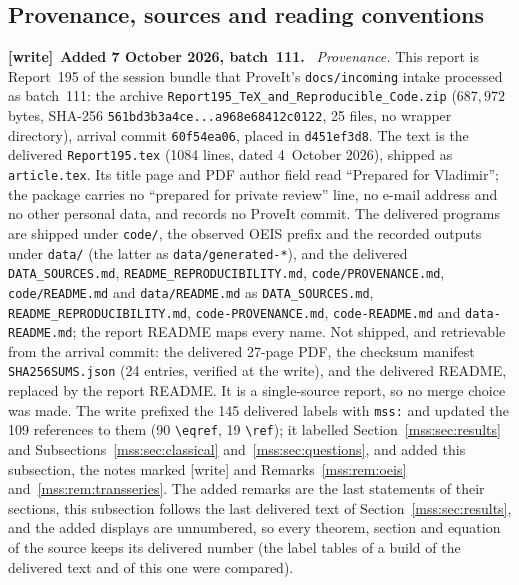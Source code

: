 \documentclass[11pt,letterpaper]{article}
\numberwithin{equation}{section}
\theoremstyle{definition}\newtheorem{definition}[theorem]{Definition}
\theoremstyle{remark}\newtheorem{remark}[theorem]{Remark}
\newcommand{\file}[1]{\nolinkurl{#1}}
\newenvironment{writenote}[1][]{\par\smallskip\begingroup\small
 \noindent\textbf{[write]}\if\relax\detokenize{#1}\relax\else~\textbf{#1.}\fi\ }%
 {\par\endgroup\smallskip}
\begin{document}
\subsection{Provenance, sources and reading conventions}\label{mss:sec:provenance}
\begin{writenote}[Added 7 October 2026, batch~111]
\emph{Provenance.} This report is Report~195 of the session bundle that
ProveIt's \file{docs/incoming} intake processed as batch~111: the archive
\file{Report195_TeX_and_Reproducible_Code.zip} ($687{,}972$ bytes, SHA-256
\file{561bd3b3a4ce...a968e68412c0122}, 25 files, no wrapper directory),
arrival commit \file{60f54ea06}, placed in \file{d451ef3d8}. The text is the
delivered \file{Report195.tex} (1084 lines, dated 4~October 2026), shipped
as \file{article.tex}. Its title page and PDF author field read ``Prepared
for Vladimir''; the package carries no ``prepared for private review'' line,
no e-mail address and no other personal data, and records no ProveIt commit.
The delivered programs are shipped under \file{code/}, the observed OEIS
prefix and the recorded outputs under \file{data/} (the latter as
\file{data/generated-*}), and the delivered \file{DATA_SOURCES.md},
\file{README_REPRODUCIBILITY.md}, \file{code/PROVENANCE.md},
\file{code/README.md} and \file{data/README.md} as
\file{DATA_SOURCES.md}, \file{README_REPRODUCIBILITY.md},
\file{code-PROVENANCE.md}, \file{code-README.md} and \file{data-README.md};
the report README maps every name. Not shipped, and retrievable from the
arrival commit: the delivered 27-page PDF, the checksum manifest
\file{SHA256SUMS.json} (24 entries, verified at the write), and the delivered
README, replaced by the report README. It is a single-source report, so no
merge choice was made. The write prefixed the 145 delivered labels with
\file{mss:} and updated the 109 references to them (90 \verb|\eqref|,
19 \verb|\ref|); it labelled Section~\ref{mss:sec:results} and
Subsections~\ref{mss:sec:classical} and~\ref{mss:sec:questions}, and added
this subsection, the notes marked [write] and
Remarks~\ref{mss:rem:oeis} and~\ref{mss:rem:transseries}. The added remarks
are the last statements of their sections, this subsection follows the last
delivered text of Section~\ref{mss:sec:results}, and the added displays are
unnumbered, so every theorem, section and equation of the source keeps its
delivered number (the label tables of a build of the delivered text and of
this one were compared).


\end{writenote}
\end{document}
